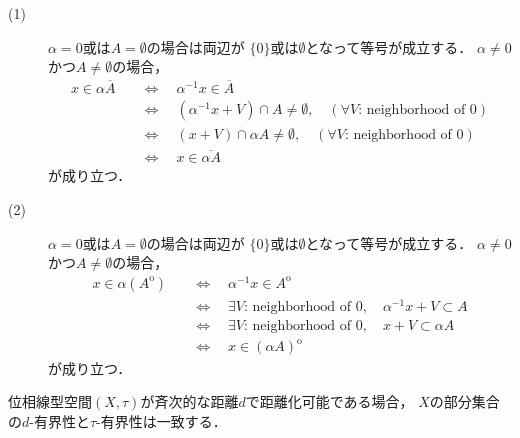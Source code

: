 	\begin{prf}\mbox{}
		\begin{description}
			\item[(1)] $\alpha = 0$或は$A = \emptyset$の場合は両辺が
				$\{0\}$或は$\emptyset$となって等号が成立する．
				$\alpha \neq 0$かつ$A \neq \emptyset$の場合，
				\begin{align}
					x \in \alpha \overline{A}
					\quad &\Longleftrightarrow \quad
					\alpha^{-1}x \in \overline{A} \\
					\quad &\Longleftrightarrow \quad
					\left(\alpha^{-1}x + V\right) \cap A \neq \emptyset, \quad 
						(\mbox{$\forall V$: neighborhood of 0}) \\
					\quad &\Longleftrightarrow \quad
					\left(x + V\right) \cap \alpha A \neq \emptyset, \quad 
						(\mbox{$\forall V$: neighborhood of 0}) \\
					\quad &\Longleftrightarrow \quad
					x \in \overline{\alpha A}
				\end{align}
				が成り立つ．
				
			\item[(2)] $\alpha = 0$或は$A = \emptyset$の場合は両辺が
				$\{0\}$或は$\emptyset$となって等号が成立する．
				$\alpha \neq 0$かつ$A \neq \emptyset$の場合，
				\begin{align}
					x \in \alpha (A^{\mathrm{o}})
					\quad &\Longleftrightarrow \quad
					\alpha^{-1}x \in A^{\mathrm{o}} \\
					\quad &\Longleftrightarrow \quad
					\mbox{$\exists V$: neighborhood of 0},\quad \alpha^{-1}x + V \subset A \\
					\quad &\Longleftrightarrow \quad
					\mbox{$\exists V$: neighborhood of 0},\quad x + V \subset \alpha A \\
					\quad &\Longleftrightarrow \quad
					x \in (\alpha A)^{\mathrm{o}}
				\end{align}
				が成り立つ．
				
		\end{description}
	\end{prf}
	
	\begin{screen}
		\begin{thm}[斉次距離で距離化可能なら距離と位相の有界性は一致する]
			位相線型空間$(X,\tau)$が斉次的な距離$d$で距離化可能である場合，
			$X$の部分集合の$d$-有界性と$\tau$-有界性は一致する．
		\end{thm}
	\end{screen}
	
